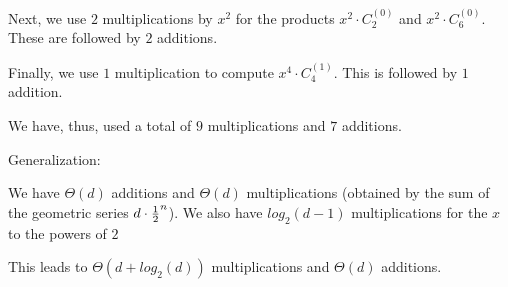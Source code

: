 \begin{itemize}
\begin{enumerate}
Next, we use $2$ multiplications by $x^2$ for the products $x^2 \cdot C_2^{(0)}$ and $x^2 \cdot C_6^{(0)}$.  These are followed by $2$ additions.

\smallskip

Finally, we use $1$ multiplication to compute $x^4 \cdot C_4^{(1)}$.  This is followed by $1$ addition.

\medskip

We have, thus, used a total of $9$ multiplications and $7$ additions.

\medskip

Generalization: 

We have $\Theta(d)$ additions and $\Theta(d)$ multiplications (obtained by the sum of the geometric series $d \cdot {{1} \over {2}}^n$). 
We also have $log_2(d-1)$ multiplications for the $x$ to the powers of $2$

This leads to $\Theta(d + log_2(d))$ multiplications and $\Theta(d)$ additions.
\end{enumerate}

\end{itemize}


